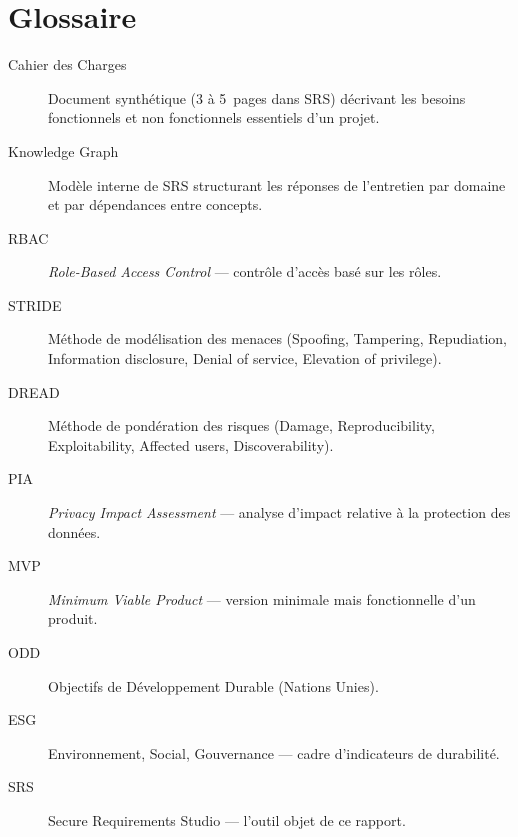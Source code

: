 \chapter{Glossaire}

\begin{description}
    \item[Cahier des Charges] Document synthétique (3 à 5~pages dans SRS) décrivant les
    besoins fonctionnels et non fonctionnels essentiels d'un projet.
    \item[Knowledge Graph] Modèle interne de SRS structurant les réponses de l'entretien
    par domaine et par dépendances entre concepts.
    \item[RBAC] \emph{Role-Based Access Control} — contrôle d'accès basé sur les rôles.
    \item[STRIDE] Méthode de modélisation des menaces (Spoofing, Tampering,
    Repudiation, Information disclosure, Denial of service, Elevation of privilege).
    \item[DREAD] Méthode de pondération des risques (Damage, Reproducibility,
    Exploitability, Affected users, Discoverability).
    \item[PIA] \emph{Privacy Impact Assessment} — analyse d'impact relative à la
    protection des données.
    \item[MVP] \emph{Minimum Viable Product} — version minimale mais fonctionnelle d'un
    produit.
    \item[ODD] Objectifs de Développement Durable (Nations Unies).
    \item[ESG] Environnement, Social, Gouvernance — cadre d'indicateurs de durabilité.
    \item[SRS] Secure Requirements Studio — l'outil objet de ce rapport.
\end{description}
